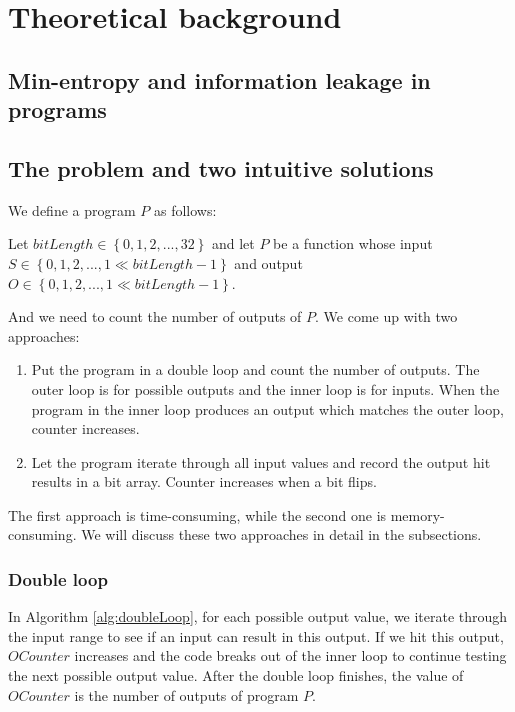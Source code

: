 

\chapter{Theoretical background}
	\label{CH_02}

\section{Min-entropy and information leakage in programs}


\section{The problem and two intuitive solutions}
We define a program $P$ as follows:
\begin{mydef}
Let $bitLength\in \left\{ {0,1,2,..., 32}\right\}$ and let $P$ be a function whose input $S \in \left\{ {0,1,2,..., 1\ll bitLength-1}\right\}$ and output $O \in \left\{ {0,1,2,..., 1\ll bitLength-1}\right\}$.
\end{mydef}

And we need to count the number of outputs of $P$. We come up with two approaches: 

\begin{enumerate}
\item Put the program in a double loop and count the number of outputs. The outer loop is for possible outputs and the inner loop is for inputs. When the program in the inner loop produces an output which matches the outer loop, counter increases.
\item Let the program iterate through all input values and record the output hit results in a bit array. Counter increases when a bit flips.
\end{enumerate}

The first approach is time-consuming, while the second one is memory-consuming. We will discuss these two approaches in detail in the subsections.

\subsection{Double loop}
In Algorithm \ref{alg:doubleLoop}, for each possible output value, we iterate through the input range to see if an input can result in this output. If we hit this output, $OCounter$ increases and the code breaks out of the inner loop to continue testing the next possible output value. After the double loop finishes, the value of $OCounter$ is the number of outputs of program $P$.

